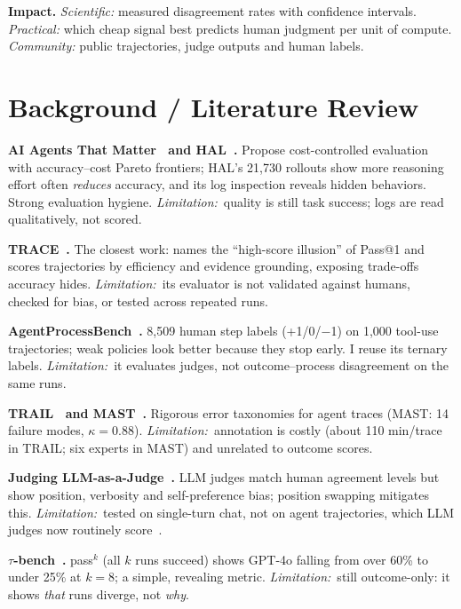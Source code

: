 \documentclass[10pt]{article}
\newcommand{\limn}{\textit{Limitation:}~}
\begin{document}
\textbf{Impact.} \emph{Scientific:} measured disagreement rates with confidence intervals. \emph{Practical:} which cheap signal best predicts human judgment per unit of compute. \emph{Community:} public trajectories, judge outputs and human labels.

\section{Background / Literature Review}

\textbf{AI Agents That Matter~\cite{kapoor2024agents} and HAL~\cite{kapoor2025hal}.} Propose cost-controlled evaluation with accuracy--cost Pareto frontiers; HAL's 21,730 rollouts show more reasoning effort often \emph{reduces} accuracy, and its log inspection reveals hidden behaviors. Strong evaluation hygiene. \limn quality is still task success; logs are read qualitatively, not scored.

\textbf{TRACE~\cite{chen2026trace}.} The closest work: names the ``high-score illusion'' of Pass@1 and scores trajectories by efficiency and evidence grounding, exposing trade-offs accuracy hides. \limn its evaluator is not validated against humans, checked for bias, or tested across repeated runs.

\textbf{AgentProcessBench~\cite{fan2026agentprocessbench}.} 8,509 human step labels (+1/0/$-$1) on 1,000 tool-use trajectories; weak policies look better because they stop early. I reuse its ternary labels. \limn it evaluates judges, not outcome--process disagreement on the same runs.

\textbf{TRAIL~\cite{deshpande2025trail} and MAST~\cite{cemri2025mast}.} Rigorous error taxonomies for agent traces (MAST: 14 failure modes, $\kappa=0.88$). \limn annotation is costly (about 110 min/trace in TRAIL; six experts in MAST) and unrelated to outcome scores.

\textbf{Judging LLM-as-a-Judge~\cite{zheng2023judging}.} LLM judges match human agreement levels but show position, verbosity and self-preference bias; position swapping mitigates this. \limn tested on single-turn chat, not on agent trajectories, which LLM judges now routinely score~\cite{zhuge2024agentjudge,lu2025agentrewardbench}.

\textbf{$\tau$-bench~\cite{yao2024taubench}.} pass$^k$ (all $k$ runs succeed) shows GPT-4o falling from over 60\% to under 25\% at $k=8$; a simple, revealing metric. \limn still outcome-only: it shows \emph{that} runs diverge, not \emph{why}.
\end{document}
